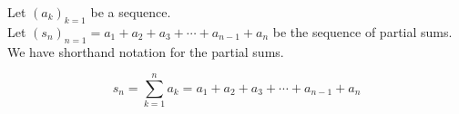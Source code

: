 \documentclass{ximera}
\begin{document}
\begin{notation}


Let $(a_k)_{k=1}$ be a sequence. \\

Let $(s_n)_{n=1} = a_1 + a_2 + a_3 + \cdots + a_{n-1} + a_n$ be the sequence of partial sums. \\


We have shorthand notation for the partial sums.

\[
s_n = \sum_{k=1}^n a_k = a_1 + a_2 + a_3 + \cdots + a_{n-1} + a_n
\]






\end{notation}
\end{document}
